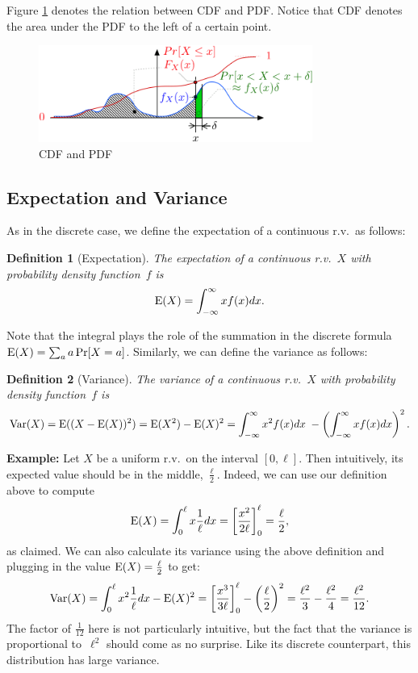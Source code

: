 \documentclass[11pt]{article}
\def\Ex#1{{\rm E}(#1)}
\def\Var#1{{\rm Var}(#1)}
\newcounter{thm}
\newtheorem{definition}{Definition}[thm]
\begin{document}
Figure \ref{fig:cdfpdf} denotes the relation between CDF and PDF. Notice that CDF denotes the area under the PDF to the left of a certain point.

\begin{figure}[h!]
\centering
\includegraphics[width=0.8\textwidth]{cdfpdf.png}
\caption{CDF and PDF}
\label{fig:cdfpdf}
\end{figure}

\subsection*{Expectation and Variance}

As in the discrete case, we define the expectation of a
continuous r.v.\ as follows:
\begin{definition}[Expectation]
The expectation of a continuous r.v.~$X$ with probability
density function~$f$ is $$
   \Ex{X} = \int_{-\infty}^\infty xf(x) dx.  $$
\end{definition}

Note that the integral plays the role of the summation in the
discrete formula $\Ex{X} = \sum_a a\Pr[X=a]$. Similarly, we can define
the variance as follows:

\begin{definition}[Variance]
The variance of a continuous r.v.~$X$ with probability
density function~$f$ is $$
   \Var{X} = \Ex{(X-\Ex{X})^2} = \Ex{X^2} - \Ex{X}^2 = \int_{-\infty}^\infty x^2 f(x) dx \;- \left(\int_{-\infty}^\infty xf(x) dx\right)^2.  $$
\end{definition}


{\bf Example:} Let $X$ be a uniform r.v.\ on the interval
$[0,\ell]$. Then intuitively, its expected value should be in the middle, $\frac{\ell}{2}$.
Indeed, we can use our definition above to compute
$$ \Ex{X} = \int_{0}^\ell x\frac{1}{\ell} dx = \left[\frac{x^2}{2\ell}\right]_0^\ell = \frac{\ell}{2}, $$
as claimed. We can also calculate its variance using the above definition
and plugging in the value $\Ex{X} = \frac{\ell}{2}$ to get:
$$ \Var{X} = \int_{0}^\ell x^2\frac{1}{\ell}dx - \Ex{X}^2 = \left[\frac{x^3}{3\ell}\right]_0^\ell - \left(\frac{\ell}{2}\right)^2 = \frac{\ell^2}{3} - \frac{\ell^2}{4} = \frac{\ell^2}{12}.  $$
The factor of $\frac{1}{12}$ here is not particularly intuitive, but
the fact that the variance is proportional to~$\ell^2$ should come
as no surprise. Like its discrete counterpart, this distribution has
large variance.
\end{document}
